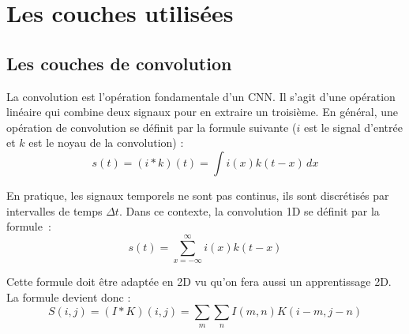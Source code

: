 % 
% 

\section{Les couches utilisées}

\subsection{Les couches de convolution}
La convolution est l'opération fondamentale d'un CNN. Il s'agit d'une opération linéaire qui combine deux signaux pour en extraire un troisième. En général, une opération de convolution se définit par la formule suivante ($i$ est le signal d'entrée et $k$ est le noyau de la convolution) :
$$ s(t) = (i * k)(t) = \int i(x)k(t-x) \, dx $$

En pratique, les signaux temporels ne sont pas continus, ils sont discrétisés par intervalles de temps $\Delta t$. Dans ce contexte, la convolution 1D se définit par la formule :
\begin{equation}
 s(t) = \sum_{x=-\infty}^{\infty} i(x)k(t-x)
 \label{eqn:Conv1D}
\end{equation}

Cette formule doit être adaptée en 2D vu qu'on fera aussi un apprentissage 2D. La formule devient donc :
\begin{equation}
 S(i,j) = (I * K)(i,j) = \sum_{m}\sum_{n} I(m,n)K(i-m,j-n)
 \label{eqn:Conv2D}
\end{equation}

